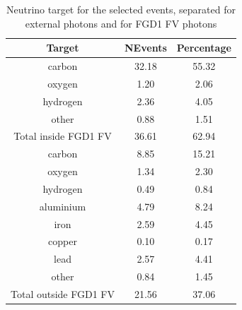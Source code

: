 \begin{table}[ht]
  \begin{adjustbox}{center}
    \begin{tabular}{ccc}
      \toprule
      Target & NEvents & Percentage \\
      \midrule
      carbon          & 32.18 & 55.32 \\
      oxygen          & 1.20  & 2.06  \\
      hydrogen        & 2.36  & 4.05  \\
      other           & 0.88  & 1.51  \\
      \midrule
      Total inside \Gls{FGD}1 \Gls{FV}  & 36.61 &  62.94 \\ 
      \midrule
      carbon          & 8.85  & 15.21 \\
      oxygen          & 1.34  & 2.30  \\
      hydrogen        & 0.49  & 0.84  \\
      aluminium       & 4.79  & 8.24  \\
      iron            & 2.59  & 4.45  \\
      copper          & 0.10  & 0.17  \\
      lead            & 2.57  & 4.41 \\
      other           & 0.84  & 1.45  \\
      \midrule
      Total outside \Gls{FGD}1 \Gls{FV} & 21.56 & 37.06 \\
      \bottomrule
    \end{tabular}
  \end{adjustbox}
  \caption[Neutrino target for the selected events]{Neutrino target
    for the selected events, separated for external photons and for
    \Gls{FGD}1 \Gls{FV} photons}
  \label{tab:target}
\end{table}

